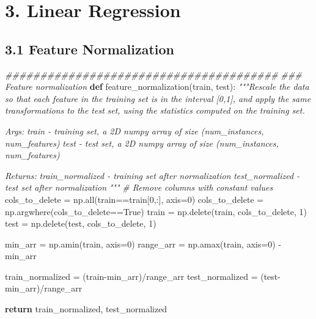 \documentclass[11pt]{article}
\newenvironment{Shaded}{}{}
\newcommand{\KeywordTok}[1]{\textcolor[rgb]{0.00,0.44,0.13}{\textbf{{#1}}}}
\newcommand{\DecValTok}[1]{\textcolor[rgb]{0.25,0.63,0.44}{{#1}}}
\newcommand{\CommentTok}[1]{\textcolor[rgb]{0.38,0.63,0.69}{\textit{{#1}}}}
\newcommand{\NormalTok}[1]{{#1}}
\newcommand{\VariableTok}[1]{\textcolor[rgb]{0.10,0.09,0.49}{{#1}}}
\newcommand{\ControlFlowTok}[1]{\textcolor[rgb]{0.00,0.44,0.13}{\textbf{{#1}}}}
\newcommand{\OperatorTok}[1]{\textcolor[rgb]{0.40,0.40,0.40}{{#1}}}
\newcommand{\BuiltInTok}[1]{{#1}}
\begin{document}
    \section{3. Linear Regression}\label{linear-regression}

    \subsection{3.1 Feature Normalization}\label{feature-normalization}

    \begin{Shaded}
\begin{Highlighting}[]
\CommentTok{#######################################}
\CommentTok{### Feature normalization}
\KeywordTok{def}\NormalTok{ feature_normalization(train, test):}
    \CommentTok{"""Rescale the data so that each feature in the training set is in}
\CommentTok{    the interval [0,1], and apply the same transformations to the test}
\CommentTok{    set, using the statistics computed on the training set.}

\CommentTok{    Args:}
\CommentTok{        train - training set, a 2D numpy array of size (num_instances, num_features)}
\CommentTok{        test - test set, a 2D numpy array of size (num_instances, num_features)}

\CommentTok{    Returns:}
\CommentTok{        train_normalized - training set after normalization}
\CommentTok{        test_normalized - test set after normalization}
\CommentTok{    """}
    \CommentTok{# Remove columns with constant values}
\NormalTok{    cols_to_delete }\OperatorTok{=}\NormalTok{ np.}\BuiltInTok{all}\NormalTok{(train}\OperatorTok{==}\NormalTok{train[}\DecValTok{0}\NormalTok{,:], axis}\OperatorTok{=}\DecValTok{0}\NormalTok{)}
\NormalTok{    cols_to_delete }\OperatorTok{=}\NormalTok{ np.argwhere(cols_to_delete}\OperatorTok{==}\VariableTok{True}\NormalTok{)}
\NormalTok{    train }\OperatorTok{=}\NormalTok{ np.delete(train, cols_to_delete, }\DecValTok{1}\NormalTok{)}
\NormalTok{    test }\OperatorTok{=}\NormalTok{ np.delete(test, cols_to_delete, }\DecValTok{1}\NormalTok{)}

\NormalTok{    min_arr }\OperatorTok{=}\NormalTok{ np.amin(train, axis}\OperatorTok{=}\DecValTok{0}\NormalTok{)}
\NormalTok{    range_arr }\OperatorTok{=}\NormalTok{ np.amax(train, axis}\OperatorTok{=}\DecValTok{0}\NormalTok{) }\OperatorTok{-}\NormalTok{ min_arr}

\NormalTok{    train_normalized }\OperatorTok{=}\NormalTok{ (train}\OperatorTok{-}\NormalTok{min_arr)}\OperatorTok{/}\NormalTok{range_arr}
\NormalTok{    test_normalized }\OperatorTok{=}\NormalTok{ (test}\OperatorTok{-}\NormalTok{min_arr)}\OperatorTok{/}\NormalTok{range_arr}

    \ControlFlowTok{return}\NormalTok{ train_normalized, test_normalized}
\end{Highlighting}
\end{Shaded}
\end{document}
